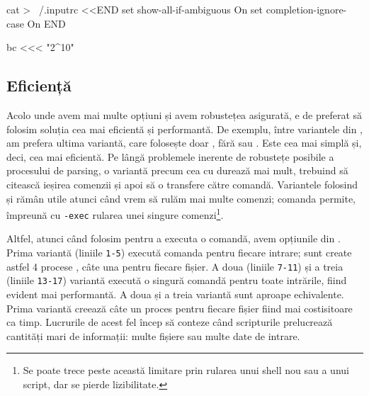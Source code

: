 \begin{screen}[caption={Here document și here string},label={lst:auto:here}]
cat > ~/.inputrc <<END
set show-all-if-ambiguous On
set completion-ignore-case On
END

bc <<< "2^10"
\end{screen}

\subsection{Eficiență}
\label{sec:auto:script-advanced:efficient}

Acolo unde avem mai multe opțiuni și avem robustețea asigurată, e de preferat să folosim soluția cea mai eficientă și performantă.
De exemplu, între variantele din , am prefera ultima variantă, care folosește doar , fără  sau .
Este cea mai simplă și, deci, cea mai eficientă.
Pe lângă problemele inerente de robustețe posibile a procesului de parsing, o variantă precum cea cu  durează mai mult, trebuind să citească ieșirea comenzii  și apoi să o transfere către comandă.
Variantele folosind  și  rămân utile atunci când vrem să rulăm mai multe comenzi; comanda  permite, împreună cu \texttt{-exec} rularea unei singure comenzi\footnote{Se poate trece peste această limitare prin rularea unui shell nou sau a unui script, dar se pierde lizibilitate.}.

Altfel, atunci când folosim  pentru a executa o comandă, avem opțiunile din .
Prima variantă (liniile \texttt{1-5}) execută comanda  pentru fiecare intrare; sunt create astfel 4 procese , câte una pentru fiecare fișier.
A doua (liniile \texttt{7-11}) și a treia (liniile \texttt{13-17}) variantă execută o singură comandă  pentru toate intrările, fiind evident mai performantă.
A doua și a treia variantă sunt aproape echivalente.
Prima variantă creează câte un proces pentru fiecare fișier fiind mai costisitoare ca timp.
Lucrurile de acest fel încep să conteze când scripturile prelucrează cantități mari de informații: multe fișiere sau multe date de intrare.



